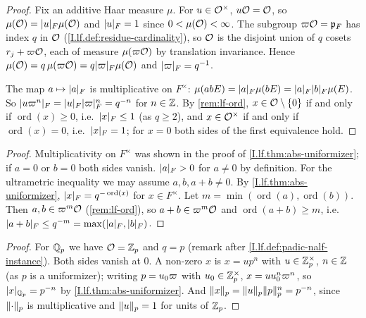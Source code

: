 \begin{theorem}
\end{theorem}
\begin{proof}
Fix an additive Haar measure $\mu$. For $u\in\mathcal{O}^\times$, $u\mathcal{O}=\mathcal{O}$, so $\mu(\mathcal{O})=\lvert u\rvert_F\mu(\mathcal{O})$ and
$\lvert u\rvert_F=1$ since $0<\mu(\mathcal{O})<\infty$. The subgroup $\varpi\mathcal{O}=\mathfrak p_F$ has index $q$ in $\mathcal{O}$
(\cref{I.lf.def:residue-cardinality}), so $\mathcal{O}$ is the disjoint union of $q$ cosets $r_j+\varpi\mathcal{O}$, each of
measure $\mu(\varpi\mathcal{O})$ by translation invariance. Hence $\mu(\mathcal{O})=q\,\mu(\varpi\mathcal{O})=q\lvert\varpi\rvert_F\mu(\mathcal{O})$ and
$\lvert\varpi\rvert_F=q^{-1}$.

The map $a\mapsto\lvert a\rvert_F$ is multiplicative on $F^\times$: $\mu(abE)=\lvert a\rvert_F\mu(bE)=\lvert a\rvert_F\lvert b\rvert_F\mu(E)$.
So $\lvert u\varpi^n\rvert_F=\lvert u\rvert_F\lvert\varpi\rvert_F^n=q^{-n}$ for $n\in\mathbb{Z}$. By \cref{rem:lf-ord}, $x\in\mathcal{O}\setminus\{0\}$
if and only if $\operatorname{ord}(x)\ge0$, i.e.\ $\lvert x\rvert_F\le1$ (as $q\ge2$), and $x\in\mathcal{O}^\times$ if and only
if $\operatorname{ord}(x)=0$, i.e.\ $\lvert x\rvert_F=1$; for $x=0$ both sides of the first equivalence hold.
\end{proof}

\begin{theorem}
\end{theorem}
\begin{proof}
Multiplicativity on $F^\times$ was shown in the proof of \cref{I.lf.thm:abs-uniformizer}; if $a=0$ or $b=0$ both
sides vanish. $\lvert a\rvert_F>0$ for $a\neq0$ by definition. For the ultrametric inequality we may assume $a,b,a+b\neq0$.
By \cref{I.lf.thm:abs-uniformizer}, $\lvert x\rvert_F=q^{-\operatorname{ord}(x)}$ for $x\in F^\times$. Let
$m=\min(\operatorname{ord}(a),\operatorname{ord}(b))$. Then $a,b\in\varpi^m\mathcal{O}$ (\cref{rem:lf-ord}), so
$a+b\in\varpi^m\mathcal{O}$ and $\operatorname{ord}(a+b)\ge m$, i.e.\ $\lvert a+b\rvert_F\le q^{-m}=\max(\lvert a\rvert_F,\lvert b\rvert_F)$.
\end{proof}

\begin{theorem}
\end{theorem}
\begin{proof}
For $\mathbb{Q}_p$ we have $\mathcal{O}=\mathbb{Z}_p$ and $q=p$ (remark after \cref{I.lf.def:padic-nalf-instance}). Both sides vanish at
$0$. A non-zero $x$ is $x=up^n$ with $u\in\mathbb{Z}_p^\times$, $n\in\mathbb{Z}$ (as $p$ is a uniformizer); writing $p=u_0\varpi$ with
$u_0\in\mathbb{Z}_p^\times$, $x=uu_0^n\varpi^n$, so $\lvert x\rvert_{\mathbb{Q}_p}=p^{-n}$ by \cref{I.lf.thm:abs-uniformizer}. And
$\lVert x\rVert_p=\lVert u\rVert_p\lVert p\rVert_p^n=p^{-n}$, since $\lVert\cdot\rVert_p$ is multiplicative and $\lVert u\rVert_p=1$ for units of
$\mathbb{Z}_p$.
\end{proof}

